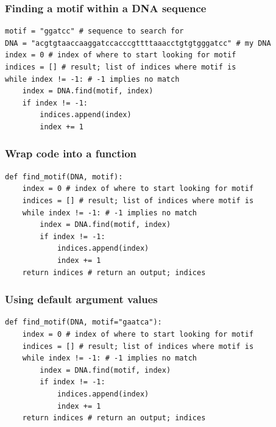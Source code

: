 \documentclass[xcolor=table]{beamer}
\begin{document}
\begin{frame}[fragile]
\frametitle{Finding a motif within a DNA sequence}

\begin{lstlisting}[style=python]
motif = "ggatcc" # sequence to search for
DNA = "acgtgtaaccaaggatccacccgttttaaacctgtgtgggatcc" # my DNA
index = 0 # index of where to start looking for motif
indices = [] # result; list of indices where motif is
while index != -1: # -1 implies no match
    index = DNA.find(motif, index)
    if index != -1:
        indices.append(index)
        index += 1
\end{lstlisting}

\end{frame}

\begin{frame}[fragile]
\frametitle{Wrap code into a function}

\begin{lstlisting}[style=python]
def find_motif(DNA, motif):
    index = 0 # index of where to start looking for motif
    indices = [] # result; list of indices where motif is
    while index != -1: # -1 implies no match
        index = DNA.find(motif, index)
        if index != -1:
            indices.append(index)
            index += 1
    return indices # return an output; indices
\end{lstlisting}

\end{frame}

\begin{frame}[fragile]
\frametitle{Using default argument values}

\begin{lstlisting}[style=python]
def find_motif(DNA, motif="gaatca"):
    index = 0 # index of where to start looking for motif
    indices = [] # result; list of indices where motif is
    while index != -1: # -1 implies no match
        index = DNA.find(motif, index)
        if index != -1:
            indices.append(index)
            index += 1
    return indices # return an output; indices
\end{lstlisting}

\end{frame}
\end{document}
